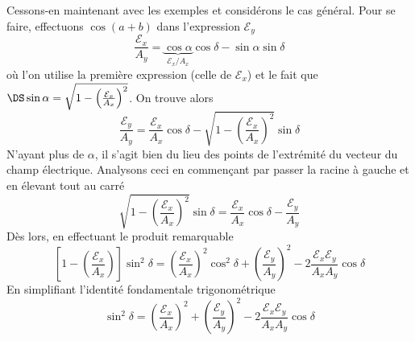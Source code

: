 	Cessons-en maintenant avec les exemples et considérons le cas général. Pour se faire, effectuons
	$\cos(a+b)$ dans l'expression $\mathcal{E}_y$
	\begin{equation}
	\frac{\mathcal{E}_x}{A_y} = \underbrace{\cos\alpha}_{\mathcal{E}_x/A_x}\cos\delta-\sin\alpha\sin\delta
	\end{equation}
	où l'on utilise la première expression (celle de $\mathcal{E}_x$) et le fait que $\DS \sin\alpha = 
	\sqrt{1-\left(\frac{\mathcal{E}_x}{A_x}\right)^2}$. On trouve alors
	\begin{equation}
	\frac{\mathcal{E}_y}{A_y} = \frac{\mathcal{E}_x}{A_x}\cos\delta -\sqrt{1-\left(\frac{\mathcal{E}_x}{
	A_x}\right)^2}\sin\delta
	\end{equation}
	N'ayant plus de $\alpha$, il s'agit bien du lieu des points de l'extrémité du vecteur du champ électrique. 
	Analysons ceci en commençant par passer la racine à gauche et en élevant tout au carré
	\begin{equation}
	\sqrt{1-\left(\frac{\mathcal{E}_x}{A_x}\right)^2}\sin\delta = \frac{\mathcal{E}_x}{A_x}\cos\delta -
	\frac{\mathcal{E}_y}{A_y} 
	\end{equation}
	Dès lors, en effectuant le produit remarquable
	\begin{equation}
	\left[1-\left(\frac{\mathcal{E}_x}{A_x}\right)\right]\sin^2\delta = \left(\frac{\mathcal{E}_x}{A_x}\right)^2
	\cos^2\delta +\left(\frac{\mathcal{E}_y}{A_y}\right)^2- 2\frac{\mathcal{E}_x\mathcal{E}_y}{A_xA_y}\cos\delta
	\end{equation}
	En simplifiant l'identité fondamentale trigonométrique
	\begin{equation}
	\sin^2\delta = \left(\frac{\mathcal{E}_x}{A_x}\right)^2
	+\left(\frac{\mathcal{E}_y}{A_y}\right)^2- 2\frac{\mathcal{E}_x\mathcal{E}_y}{A_xA_y}\cos\delta
	\end{equation}
	
